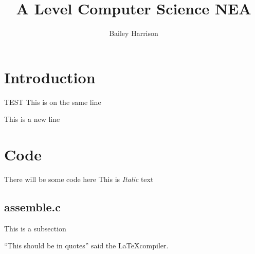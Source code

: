\documentclass[a4paper]{report}
\title{A Level Computer Science NEA}
\author{Bailey Harrison}
\begin{document}
\maketitle

\tableofcontents

\section{Introduction}

TEST
This is on the same line

This is a new line


\section{Code}

There will be some code here
This is \textit{Italic} text

\subsection{assemble.c}

This is a subsection

``This should be in quotes'' said the \LaTeX compiler.
\end{document}
